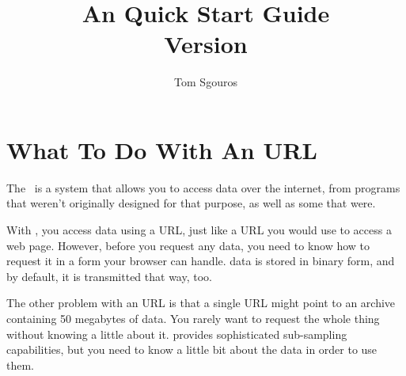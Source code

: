 \documentclass{dods-book}
\newcommand{\DOCversion}{Version \rcsInfoRevision}
\begin{document}
\title{An \opendap Quick Start Guide\\\DOCversion}
\author{Tom Sgouros}
\date{\rcsInfoDate}
\maketitle

\copyrightmatter

\W{}

%

\tableofcontents
\listoffigures

\clearemptydoublepage


%


%
%

\T\chapter{What To Do With An \opendap URL}

The \OPD\ is a system that allows you to access data over the internet,
from programs that weren't originally designed for that purpose, as
well as some that were.

With \opendap, you access data using a URL, just like a URL you would use
to access a web page.  However, before you request any data, you need
to know how to request it in a form your browser can handle.  \opendap
data is stored in binary form, and by default, it is transmitted that
way, too.

The other problem with an \opendap URL is that a single URL might point to
an archive containing 50 megabytes of data.  You rarely want to
request the whole thing without knowing a little about it.  \opendap
provides sophisticated sub-sampling capabilities, but you need to know
a little bit about the data in order to use them.

\label{reynolds,chapter}
\end{document}
